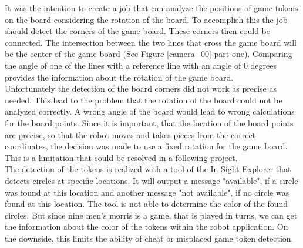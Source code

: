 \documentclass[a4paper]{spie}  %
\begin{document}
\begin{large}
It was the intention to create a job that can analyze the positions of game tokens on the board considering the rotation of the board. To accomplish this the job should detect the corners of the game board. These corners then could be connected. The intersection between the two lines that cross the game board will be the center of the game board (See Figure \ref{camera_00} part one). Comparing the angle of one of the lines with a reference line with an angle of 0 degrees provides the information about the rotation of the game board.\\ Unfortunately the detection of the board corners did not work as precise as needed. This lead to the problem that the rotation of the board could not be analyzed correctly. A wrong angle of the board would lead to wrong calculations for the board points. Since it is important, that the location of the board points are precise, so that the robot moves and takes pieces from the correct coordinates, the decision was made to use a fixed rotation for the game board. This is a limitation that could be resolved in a following project.\\
The detection of the tokens is realized with a tool of the In-Sight Explorer that detects circles at specific locations. It will output a message "available", if a circle was found at this location and another message "not available", if no circle was found at this location. The tool is not able to determine the color of the found circles. But since nine men's  morris is a game, that is played in turns, we can get the information about the color of the tokens within the robot application. On the downside, this limits the ability of cheat or misplaced game token detection.



\end{large}
\end{document}
